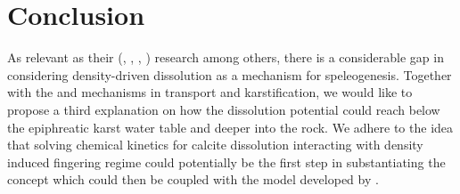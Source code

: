 \section{Conclusion}\label{sec:conclusionLiterature}
As relevant as their (\citet{Dreybrodt1996}, \citet{gabrovvsek2000role}, \citet{dreybrodt2004dissolution}, \citet{Dreybrodt2012}) 
research among others, there is a considerable gap in considering density-driven dissolution as a mechanism for speleogenesis. 
Together with the \citet{gabrovvsek2000role} and \citet{bogli1980physical} mechanisms in transport and karstification, 
we would like to propose a third explanation on how the dissolution potential could reach below the epiphreatic karst water table 
and deeper into the rock. We adhere to the idea that solving chemical kinetics for calcite dissolution interacting with density 
induced fingering regime could potentially be the first step in substantiating the concept which could then be coupled with the 
model developed by \citet{Class2020}.
\endinput
